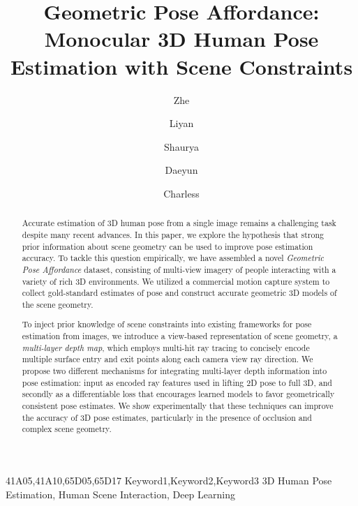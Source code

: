 \documentclass[times,referee,twocolumn,final,authoryear]{elsarticle}
\begin{document}
\thispagestyle{empty}
                                                             

\clearpage



\ifpreprint
  \setcounter{page}{1}
\else
  \setcounter{page}{1}
\fi



\begin{frontmatter}

\title{Geometric Pose Affordance: Monocular 3D Human Pose Estimation with Scene Constraints}

\author[1]{Zhe } 
\author[1]{Liyan }
\author[1]{Shaurya  }
\author[1]{Daeyun  }
\author[1]{Charless  }


\address[1]{Department of Computer Science, University of California, Irvine, CA 92617, USA}




\begin{abstract}
  Accurate estimation of 3D human pose from a single image remains a challenging task
despite many recent advances. In this paper, we explore the hypothesis that
strong prior information about scene geometry can be used to improve pose
estimation accuracy. To tackle this question empirically, we have assembled a
novel {\em Geometric Pose Affordance} dataset, consisting of multi-view
imagery of people interacting with a variety of rich 3D environments.  We
utilized a commercial motion capture system to collect gold-standard estimates
of pose and construct accurate geometric 3D models of the scene geometry.

To inject prior knowledge of scene constraints into existing frameworks for
pose estimation from images, we introduce a view-based representation of
scene geometry, a {\em multi-layer depth map}, which employs multi-hit ray
tracing to concisely encode multiple surface entry and exit points along each
camera view ray direction. We propose two different mechanisms for
integrating multi-layer depth information into pose estimation: 
input as encoded ray features used in lifting 2D pose to full 3D, and secondly
as a differentiable loss that encourages learned models to favor geometrically
consistent pose estimates. We show experimentally that these techniques can
improve the accuracy of 3D pose estimates, particularly in the
presence of occlusion and complex scene geometry.
\end{abstract}

\begin{keyword}
\MSC 41A05\sep 41A10\sep 65D05\sep 65D17
\KWD Keyword1\sep Keyword2\sep Keyword3
\KWD 3D Human Pose Estimation, Human Scene Interaction, Deep Learning
\end{keyword}

\end{frontmatter}
\end{document}

